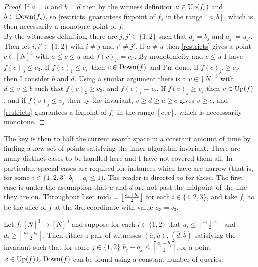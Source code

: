 \begin{proof}
   If $a = u$ and $b = d$ then by the witness definition $a \in \mathrm{Up}(f_s)$ and
  $b \in \mathrm{Down}(f_s)$, so \cref{restricts} guarantees fixpoint of $f_s$ in the range $[a, b]$, which is then
  necessarily a monotone point of $f$. \\
  By the witnesses definition, there are $j, j' \in \{1, 2\}$ such that $d_j = b_j$ and $a_{j'} = u_{j'}$.
  Then let $i, i' \in \{1, 2\}$ with $i \neq j$ and $i' \neq j'$.
  If $a \neq u$ then \cref{restricts} gives a point $c \in [N]^3$ with $a \leq c \leq u$ and $f(c)_{i'} = c_{i'}$.
  By monotonicity and $c \leq u$ I have $f(c)_3 \leq c_3$. If $f(c)_1 \leq c_{j'}$ then $c \in \mathrm{Down}(f)$ and I'm done.
  If $f(c)_{j'} \geq c_{j'}$ then I consider $b$ and $d$. Using a similar argument there is a $v \in [N]^3$ with $d \leq v \leq b$
  such that $f(v)_3 \geq v_3$, and $f(v)_i = v_i$. If $f(v)_j \geq v_j$ then $v \in \mathrm{Up}(f)$, and if $f(v)_j \leq v_j$
  then by the invariant, $v \geq d \geq u \geq c$ gives $v \geq c$, 
  and \cref{restricts} guarantees a fixpoint of $f_s$ in the range $[c, v]$, which is neccessarily monotone.
\end{proof}
The key is then to half the current search space in a constant amount of time by finding
a new set of points satisfying the inner algorithm invariant. There are many distinct cases
to be handled here and I have not covered them all. In particular, special cases are required for
instances which have are narrow (that is, for some $i \in \{1, 2, 3\}$ $b_i - a_i \leq 1$). The 
reader is directed to \citep{fasterTarski} for these. The first case is under the assumption that $u$ and $d$ are
not past the midpoint of the line they are on.
Throughout I set $\mathrm{mid}_i = \left \lfloor \frac{a_i + b_i}{2} \right\rfloor$ for each $i \in \{1, 2, 3\}$, and take
$f_s$ to be the slice of $f$ at the $3$rd coordinate with value $a_3 = b_3$.
\begin{lemma}\label{innerMainCase}
  Let $f : [N]^3 \to [N]^3$ and
  suppose for each $i \in \{1, 2\}$ that $u_i \leq \left \lfloor \frac{a_i + b_i}{2} \right \rfloor$
  and $d_i \geq \left \lfloor \frac{a_i + b_i}{2} \right\rfloor$.
  Then either a pair of witnesses $(\overline{a}, \overline{u})$, $(\overline{d}, \overline{b})$ satisfying the invariant
  such that for some $j \in \{1, 2\}$ $\overline{b}_j - \overline{a}_j \leq \left\lceil \frac{a_j - b_j}{2}\right \rceil$, 
  or a point $x \in \mathrm{Up}(f) \cup \mathrm{Down}(f)$
  can be found using a constant
  number of queries. 
\end{lemma}
